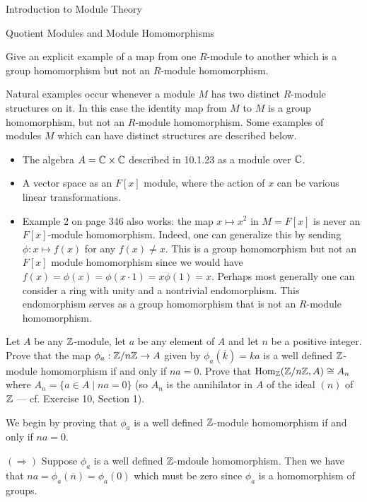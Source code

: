\begin{chapter}{Introduction to Module Theory}
\begin{section}{Quotient Modules and Module Homomorphisms}
\begin{problem}\label{ex:10.2.3}
Give an explicit example of a map from one $R$-module to another which is a group homomorphism but not an $R$-module homomorphism.
\end{problem}
\begin{solution}
Natural examples occur whenever a module $M$ has two distinct $R$-module structures on it. In this case the identity map from $M$ to $M$ is a group homomorphism, but not an $R$-module homomorphism. Some examples of modules $M$ which can have distinct structures are described below. \begin{itemize}
\item The algebra $A = \mathbb{C}\times\mathbb{C}$ described in 10.1.23 as a module over $\mathbb{C}$.
\item A vector space as an $F[x]$ module, where the action of $x$ can be various linear transformations.
\item  Example 2 on page 346 also works: the map $x\mapsto x^2$ in $M = F[x]$ is never an $F[x]$-module homomorphism. Indeed, one can generalize this by sending $\phi:x\mapsto f(x)$ for any $f(x)\neq x$. This is a group homomorphism but not an $F[x]$ module homomorphism since we would have $f(x) = \phi(x) = \phi(x\cdot 1) = x\phi(1) = x$. Perhaps most generally one can consider a ring with unity and a nontrivial endomorphism. This endomorphism serves as a group homomorphism that is not an $R$-module homomorphism.
\end{itemize}
\end{solution}\oneperpage



\begin{problem}\label{ex:10.2.4}
Let $A$ be any $\mathbb{Z}$-module, let $a$ be any element of $A$ and let $n$ be a positive integer. Prove that the map $\phi_a:\mathbb{Z}/n\mathbb{Z}\to A$ given by $\phi_a(\overline{k}) = ka$ is a well defined $\mathbb{Z}$-module homomorphism if and only if $na=0$. Prove that $\operatorname{Hom}_{\mathbb{Z}}(\mathbb{Z}/n\mathbb{Z}, A)\cong A_n$ where $A_n=\{a\in A \mid na=0\}$ (so $A_n$ is the annihilator in $A$ of the ideal $(n)$ of $\mathbb{Z}$ --- cf. Exercise 10, Section 1).
\end{problem}
\begin{solution}
We begin by proving that $\phi_a$ is a well defined $\mathbb{Z}$-module homomorphism if and only if $na=0$.

$(\Rightarrow)$ Suppose $\phi_a$ is a well defined $\mathbb{Z}$-mdoule homomorphism. Then we have that $na = \phi_a(\overline{n}) = \phi_a(0)$ which must be zero since $\phi_a$ is a homomorphism of groups.


\end{solution}
\end{section}
\end{chapter}
